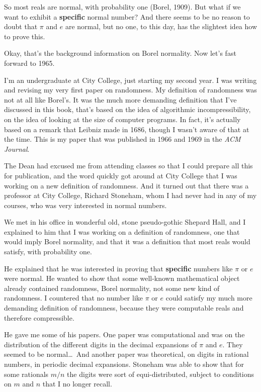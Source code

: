 \documentclass[12pt]{book}
\begin{document}
So most reals are normal, with probability one (Borel, 1909).
But what if we want to exhibit a \textbf{specific} normal number?
And there seems to be no reason to doubt that $\pi$ and $e$ are normal, but no one,
to this day, has the slightest idea how to prove this.
 
Okay, that's the background information on Borel normality.
Now let's fast forward to 1965.
 
I'm an undergraduate at City College, just starting my second year.
I was writing and revising my very first paper on randomness.
My definition of randomness was not at all like Borel's.
It was
the much more demanding definition that I've discussed in this book,
that's based on the idea of algorithmic incompressibility, on the idea of looking at the size
of computer programs. 
In fact, it's actually based on a remark that Leibniz made in 1686, though I wasn't aware of
that at the time.
This is my paper that was published in 1966 and 1969 in the \emph{ACM Journal}.
 
The Dean had excused me from attending classes so that I could prepare all this for publication,
and the word quickly got around at City College that I was working on a new definition of randomness.
And it turned out that 
there was
a professor at City College, Richard Stoneham, whom I had never had in any of my courses,
who was very interested in normal numbers.  
 
We met in his office in wonderful old, stone pseudo-gothic
Shepard Hall, 
and I explained to him that I was working on a definition of randomness, one that would
imply Borel normality,
and that it was a definition that most reals
would satisfy, with probability one.
  
He explained that he was interested
in proving that \textbf{specific} numbers like $\pi$ or $e$ were normal. 
He wanted to
show that some well-known
mathematical object already contained randomness, Borel normality, not some new kind of randomness.
I countered that no number like $\pi$ or $e$ could satisfy
my much more demanding definition of randomness, 
because they were computable reals and therefore compressible.
 
He gave me some of his papers. One paper was computational and was 
on the distribution of the different
digits in the decimal expansions of $\pi$ and $e$. 
They seemed to be normal\ldots\
And another paper was theoretical, on digits in rational
numbers, in periodic decimal expansions.  Stoneham was able to show that for some rationals
$m/n$ the digits were sort of equi-distributed,
subject to conditions on $m$ and $n$ that I no longer recall. 
 
\end{document}
